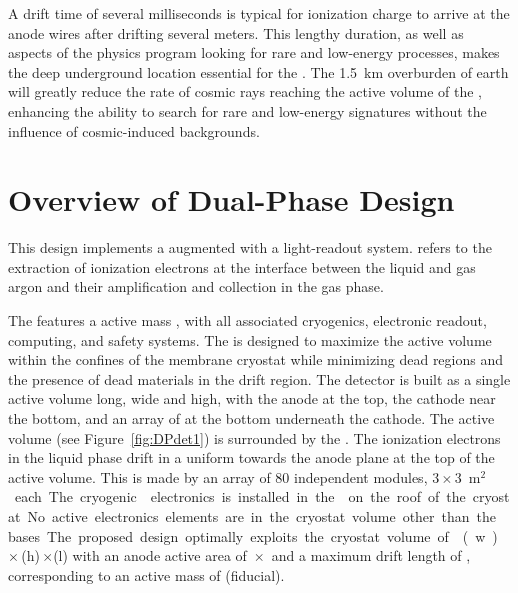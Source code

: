 A drift time of several milliseconds is typical for ionization charge to arrive at the anode wires after drifting several meters.  This lengthy duration, as well as aspects of the  physics program looking for rare and low-energy processes, makes the deep underground location essential for the .  The \SI{1.5}{km} overburden of earth will greatly reduce the rate of cosmic rays reaching the active volume of the , enhancing the ability to search for rare and low-energy signatures without the influence of cosmic-induced backgrounds.  


\section{Overview of Dual-Phase Design}
\label{sec:dp-execsum-description}

This  design implements a   augmented with a light-readout system.   refers to the extraction of ionization electrons at the interface between the liquid and gas argon and their amplification and collection in the gas phase.

The  features a  \dpactivelarmass{} active mass , with all associated cryogenics, electronic readout, computing, and safety systems. The  is designed to maximize the active volume within the confines of the membrane cryostat while minimizing dead regions and the presence of dead materials in the drift region. The detector is built as a single active volume \dptpclen long, \dptpcwdth wide and \tpcheight high, with the anode at the top, the cathode near the bottom, and an array of  at the bottom underneath the cathode. The active volume (see Figure~\ref{fig:DPdet1}) is surrounded by the . The ionization electrons in the liquid phase drift  in a uniform \efield towards the anode plane at the top of the active volume. This is made by an array of \num{80} independent  modules, \num{3}\,$\times$\,\SI{3}{m$^2$} each. The cryogenic  electronics is  installed in the  on the roof of the cryostat. No active electronics elements are in the cryostat volume other than the  bases. The proposed design optimally exploits the cryostat volume of \cryostatwdth{}(w)\,$\times$\,\cryostatht{}(h)\,$\times$\cryostatlen{}(l) with an anode active area of \dptpcwdth{}\,$\times$\,\cryostatlen{} and a maximum drift length of \dpmaxdrift{}, corresponding to an active  mass of \dpactivelarmass  (\dpfidlarmass fiducial). 

